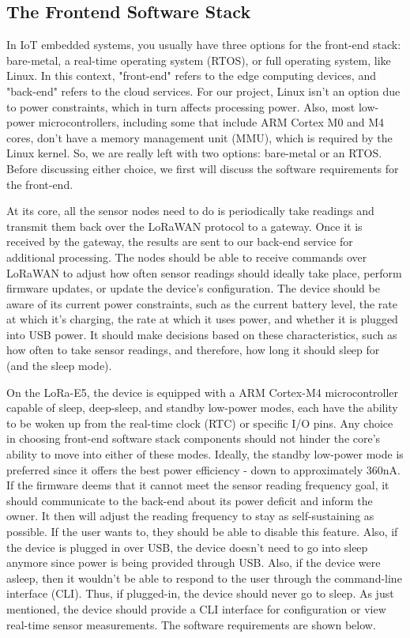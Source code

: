 \subsection{The Frontend Software Stack}
In IoT embedded systems, you usually have three options for the front-end stack:
bare-metal, a real-time operating system (RTOS), or full operating system, like
Linux. In this context, "front-end" refers to the edge computing devices, and
"back-end" refers to the cloud services. For our project, Linux isn't an option
due to power constraints, which in turn affects processing power. Also, most
low-power microcontrollers, including some that include ARM Cortex M0 and M4
cores, don't have a memory management unit (MMU), which is required by the Linux
kernel. So, we are really left with two options: bare-metal or an RTOS. Before
discussing either choice, we first will discuss the software requirements for
the front-end. 

At its core, all the sensor nodes need to do is periodically take readings and
transmit them back over the LoRaWAN protocol to a gateway. Once it is received
by the gateway, the results are sent to our back-end service for additional
processing. The nodes should be able to receive commands over LoRaWAN to adjust
how often sensor readings should ideally take place, perform firmware updates,
or update the device's configuration. The device should be aware of its current
power constraints, such as the current battery level, the rate at which it's
charging, the rate at which it uses power, and whether it is plugged into USB
power. It should make decisions based on these characteristics, such as how
often to take sensor readings, and therefore, how long it should sleep for (and
the sleep mode).

On the LoRa-E5, the device is equipped with a ARM Cortex-M4
microcontroller capable of sleep, deep-sleep, and standby low-power modes, each
have the ability to be woken up from the real-time clock (RTC) or specific I/O
pins. Any choice in choosing front-end software stack components should not
hinder the core's ability to move into either of these modes. Ideally, the
standby low-power mode is preferred since it offers the best power efficiency -
down to approximately 360nA. If the firmware deems that it cannot meet the
sensor reading frequency goal, it should communicate to the back-end about its
power deficit and inform the owner. It then will adjust the reading frequency to
stay as self-sustaining as possible. If the user wants to, they should be able
to disable this feature. Also, if the device is plugged in over USB, the device
doesn't need to go into sleep anymore since power is being provided through USB.
Also, if the device were asleep, then it wouldn't be able to respond to the user
through the command-line interface (CLI). Thus, if plugged-in, the device should
never go to sleep. As just mentioned, the device should provide a CLI interface
for configuration or view real-time sensor measurements. The software
requirements are shown below.



